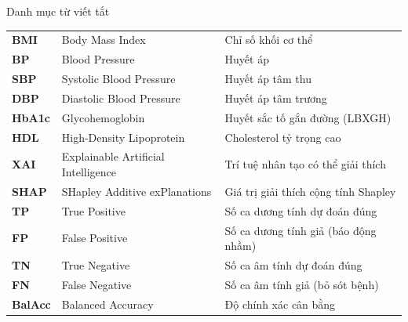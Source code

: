 \documentclass{uetgraduation}
\begin{document}
\begin{contentlisting}
\begin{contentlistingsection}{Danh mục từ viết tắt}
\begin{longtable}{p{2.0cm} p{6.4cm} p{6.4cm}}
\textbf{BMI}    & Body Mass Index & Chỉ số khối cơ thể \\
\textbf{BP}     & Blood Pressure & Huyết áp \\
\textbf{SBP}    & Systolic Blood Pressure & Huyết áp tâm thu \\
\textbf{DBP}    & Diastolic Blood Pressure & Huyết áp tâm trương \\
\textbf{HbA1c}  & Glycohemoglobin & Huyết sắc tố gắn đường (LBXGH) \\
\textbf{HDL}    & High-Density Lipoprotein & Cholesterol tỷ trọng cao \\
\textbf{XAI}    & Explainable Artificial Intelligence & Trí tuệ nhân tạo có thể giải thích \\
\textbf{SHAP}   & SHapley Additive exPlanations & Giá trị giải thích cộng tính Shapley \\
\textbf{TP}     & True Positive & Số ca dương tính dự đoán đúng \\
\textbf{FP}     & False Positive & Số ca dương tính giả (báo động nhầm) \\
\textbf{TN}     & True Negative & Số ca âm tính dự đoán đúng \\
\textbf{FN}     & False Negative & Số ca âm tính giả (bỏ sót bệnh) \\
\textbf{BalAcc} & Balanced Accuracy & Độ chính xác cân bằng \\
\end{longtable}
\end{contentlistingsection}
\end{contentlisting}







\appendix

\end{document}
